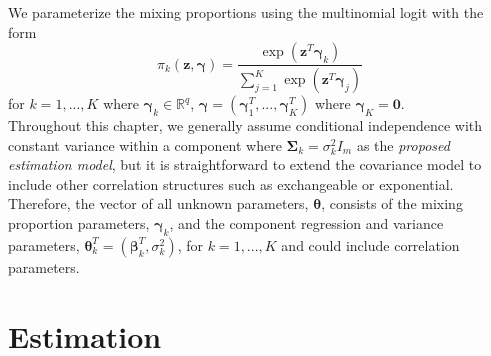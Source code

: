 \documentclass[10pt]{article}
\newcommand{\B}[0]{\mathbf}
\newcommand{\bs}[0]{\boldsymbol}
\begin{document}
We parameterize the mixing proportions using the multinomial logit with the form
$$\pi_{k}(\B z,\bs\gamma)=\frac{\exp(\B z^{T}\bs\gamma_{k})}{\sum_{j=1}^{K}\exp(\B z^{T}\bs\gamma_{j})}$$ 
for $k=1,...,K$ where $\bs \gamma_{k}\in\mathbb{R}^{q}$, $\bs\gamma = (\bs\gamma_1^T,...,\bs\gamma_K^T)$ where $\bs\gamma_{K}=\B 0$.\\

Throughout this chapter, we generally assume conditional independence with constant variance within a component where $\B\Sigma_{k}=\sigma^{2}_{k}I_{m}$ as the {\em proposed estimation model}, but it is straightforward to extend the covariance model to include other correlation structures such as exchangeable or exponential. Therefore, the vector of all unknown parameters, $\bs\theta$, consists of the mixing proportion parameters, $\bs\gamma_{k}$, and the component regression and variance parameters, $\bs\theta^{T}_{k}=(\bs\beta^{T}_{k},\sigma^{2}_{k})$, for $k=1,...,K$ and could include correlation parameters.  
\section{Estimation}
\end{document}

